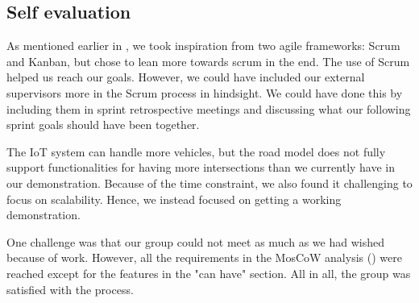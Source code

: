 \subsection{Self evaluation}
As mentioned earlier in , we took inspiration from two agile frameworks: Scrum and Kanban, but chose to lean more towards scrum in the end. The use of Scrum helped us reach our goals. However, we could have included our external supervisors more in the Scrum process in hindsight. We could have done this by including them in sprint retrospective meetings and discussing what our following sprint goals should have been together.

The IoT system can handle more vehicles, but the road model does not fully support functionalities for having more intersections than we currently have in our demonstration. Because of the time constraint, we also found it challenging to focus on scalability. Hence, we instead focused on getting a working demonstration.  

One challenge was that our group could not meet as much as we had wished because of work. However, all the requirements in the MosCoW analysis () were reached except for the features in the "can have" section. All in all, the group was satisfied with the process.

